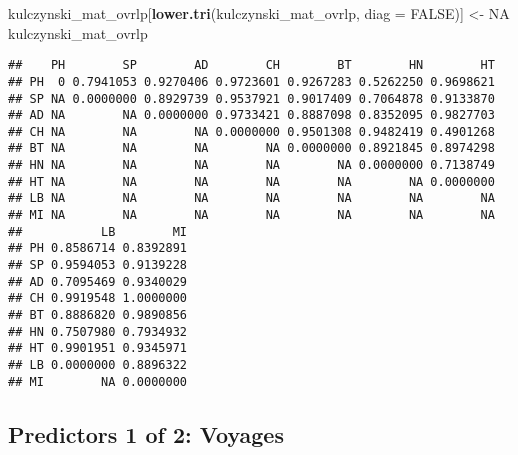 \documentclass[]{article}
\newenvironment{Shaded}{\begin{snugshade}}{\end{snugshade}}
\newcommand{\KeywordTok}[1]{\textcolor[rgb]{0.13,0.29,0.53}{\textbf{#1}}}
\newcommand{\DataTypeTok}[1]{\textcolor[rgb]{0.13,0.29,0.53}{#1}}
\newcommand{\StringTok}[1]{\textcolor[rgb]{0.31,0.60,0.02}{#1}}
\newcommand{\OtherTok}[1]{\textcolor[rgb]{0.56,0.35,0.01}{#1}}
\newcommand{\NormalTok}[1]{#1}
\begin{document}
\begin{Shaded}
\begin{Highlighting}[]
\NormalTok{kulczynski_mat_ovrlp[}\KeywordTok{lower.tri}\NormalTok{(kulczynski_mat_ovrlp, }\DataTypeTok{diag =} \OtherTok{FALSE}\NormalTok{)] <-}\StringTok{ }\OtherTok{NA}
\NormalTok{kulczynski_mat_ovrlp}
\end{Highlighting}
\end{Shaded}

\begin{verbatim}
##    PH        SP        AD        CH        BT        HN        HT
## PH  0 0.7941053 0.9270406 0.9723601 0.9267283 0.5262250 0.9698621
## SP NA 0.0000000 0.8929739 0.9537921 0.9017409 0.7064878 0.9133870
## AD NA        NA 0.0000000 0.9733421 0.8887098 0.8352095 0.9827703
## CH NA        NA        NA 0.0000000 0.9501308 0.9482419 0.4901268
## BT NA        NA        NA        NA 0.0000000 0.8921845 0.8974298
## HN NA        NA        NA        NA        NA 0.0000000 0.7138749
## HT NA        NA        NA        NA        NA        NA 0.0000000
## LB NA        NA        NA        NA        NA        NA        NA
## MI NA        NA        NA        NA        NA        NA        NA
##           LB        MI
## PH 0.8586714 0.8392891
## SP 0.9594053 0.9139228
## AD 0.7095469 0.9340029
## CH 0.9919548 1.0000000
## BT 0.8886820 0.9890856
## HN 0.7507980 0.7934932
## HT 0.9901951 0.9345971
## LB 0.0000000 0.8896322
## MI        NA 0.0000000
\end{verbatim}

\subsection{Predictors 1 of 2:
Voyages}\label{predictors-1-of-2-voyages-1}
\end{document}
